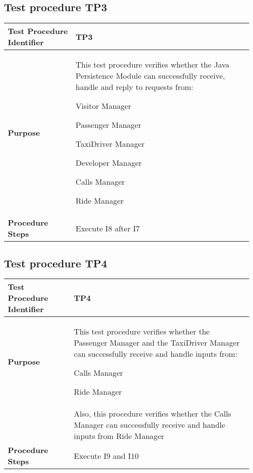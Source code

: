 \subsection{Test procedure TP3}

\begin{table}[!htbp]
\begin{center}
\begin{tabular}[t]{p{}p{}}

\hline
\textbf{Test Procedure Identifier} & TP3 \\
\hline
\textbf{Purpose} & This test procedure verifies whether the Java Persistence Module can successfully receive, handle and reply to requests from:
\begin{itemize*}
	\item Visitor Manager
	\item Passenger Manager
	\item TaxiDriver Manager
	\item Developer Manager
	\item Calls Manager
	\item Ride Manager
\end{itemize*} \\
\hline
\textbf{Procedure Steps} & Execute I8 after I7\\
\hline

\end{tabular}
\end{center}
\end{table}


\subsection{Test procedure TP4}

\begin{table}[!htbp]
\begin{center}
\begin{tabular}[t]{p{}p{}}

\hline
\textbf{Test Procedure Identifier} & TP4 \\
\hline
\textbf{Purpose} & This test procedure verifies whether the Passenger Manager and the TaxiDriver Manager can successfully receive and handle inputs from:
\begin{itemize*}
	\item Calls Manager
	\item Ride Manager
\end{itemize*} \\
 & Also, this procedure verifies whether the Calls Manager can successfully receive and handle inputs from Ride Manager \\
\textbf{Procedure Steps} & Execute I9 and I10\\
\hline

\end{tabular}
\end{center}
\end{table}


